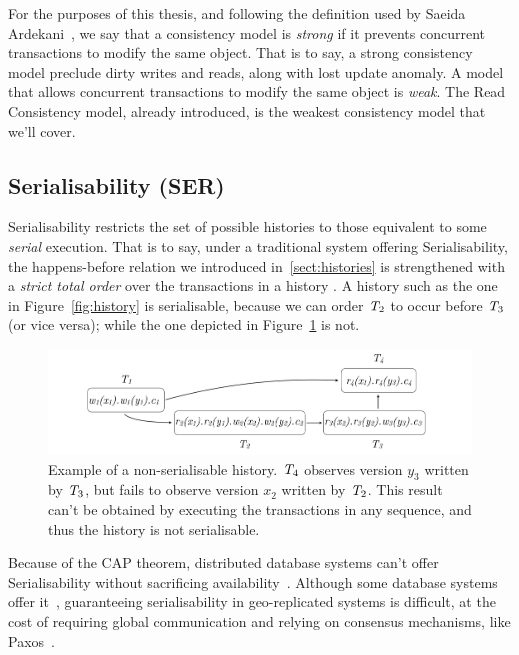 For the purposes of this thesis, and following the definition used by Saeida Ardekani~\citep{ardekani_thesis}, we say that a consistency model is \emph{strong} if it prevents concurrent transactions to modify the same object. That is to say, a strong consistency model preclude dirty writes and reads, along with lost update anomaly. A model that allows concurrent transactions to modify the same object is \emph{weak}. The Read Consistency model, already introduced, is the weakest consistency model that we'll cover.

\subsection{Serialisability (SER)}
\label{sect:ser}

Serialisability restricts the set of possible histories to those equivalent to some \emph{serial} execution. That is to say, under a traditional system offering Serialisability, the happens-before relation we introduced in~\ref{sect:histories} is strengthened with a \emph{strict total order} over the transactions in a history . A history such as the one in Figure~\ref{fig:history} is serialisable, because we can order $\mathit{T}_2$ to occur before $\mathit{T}_3$ (or vice versa); while the one depicted in Figure~\ref{fig:non_ser_history} is not.

\begin{figure}[h]
  \centering
  \vspace{-0.3cm}
  \includegraphics[width=\textwidth]{figures/non_ser_hist.pdf}
  \vspace{-1cm}
  \caption{Example of a non-serialisable history. $\mathit{T}_4$ observes version $y_3$ written by $\mathit{T}_3$, but fails to observe version $x_2$ written by $\mathit{T}_2$. This result can't be obtained by executing the transactions in any sequence, and thus the history is not serialisable.}
  \label{fig:non_ser_history}
\end{figure}

Because of the CAP theorem, distributed database systems can't offer Serialisability without sacrificing availability~\citep{cap-brewer, cap-theorem}. Although some database systems offer it~\citep{google_spanner}, guaranteeing serialisability in geo-replicated systems is difficult, at the cost of requiring global communication and relying on consensus mechanisms, like Paxos~\citep{lamport_paxos}.

